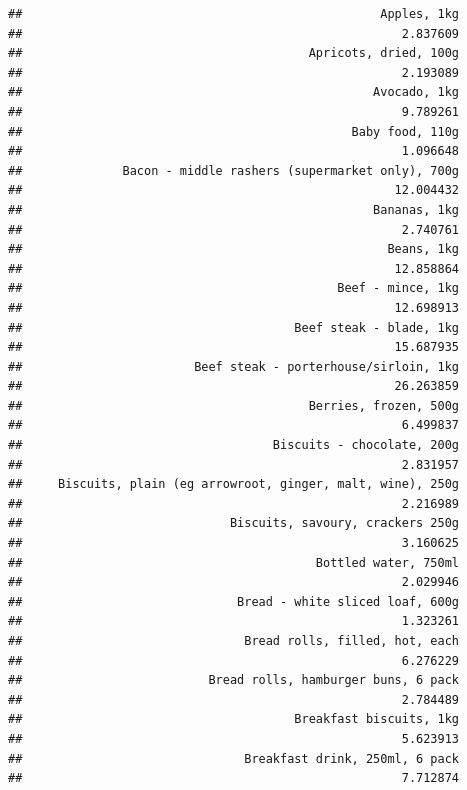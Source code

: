 \documentclass[
  landscape]{article}
\begin{document}
\begin{verbatim}
##                                                  Apples, 1kg 
##                                                     2.837609 
##                                        Apricots, dried, 100g 
##                                                     2.193089 
##                                                 Avocado, 1kg 
##                                                     9.789261 
##                                              Baby food, 110g 
##                                                     1.096648 
##              Bacon - middle rashers (supermarket only), 700g 
##                                                    12.004432 
##                                                 Bananas, 1kg 
##                                                     2.740761 
##                                                   Beans, 1kg 
##                                                    12.858864 
##                                            Beef - mince, 1kg 
##                                                    12.698913 
##                                      Beef steak - blade, 1kg 
##                                                    15.687935 
##                        Beef steak - porterhouse/sirloin, 1kg 
##                                                    26.263859 
##                                        Berries, frozen, 500g 
##                                                     6.499837 
##                                   Biscuits - chocolate, 200g 
##                                                     2.831957 
##     Biscuits, plain (eg arrowroot, ginger, malt, wine), 250g 
##                                                     2.216989 
##                             Biscuits, savoury, crackers 250g 
##                                                     3.160625 
##                                         Bottled water, 750ml 
##                                                     2.029946 
##                              Bread - white sliced loaf, 600g 
##                                                     1.323261 
##                               Bread rolls, filled, hot, each 
##                                                     6.276229 
##                          Bread rolls, hamburger buns, 6 pack 
##                                                     2.784489 
##                                      Breakfast biscuits, 1kg 
##                                                     5.623913 
##                               Breakfast drink, 250ml, 6 pack 
##                                                     7.712874 

\end{verbatim}
\end{document}
